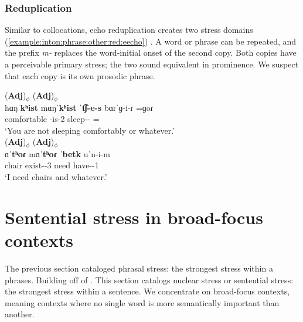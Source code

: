 \subsubsection{Reduplication}\label{section:intonation:phrase:other:redup}

Similar to collocations, echo reduplication creates two stress domains (\ref{example:inton:phrase:other:red:eecho})    \citep[14]{Margaryan-1997-ArmenianPhonology}. A word or phrase can be repeated, and the prefix  \textit{m-} replaces the word-initial onset of the second copy. Both copies have a perceivable primary stress; the two sound equivalent in prominence. We suspect that each copy is its own prosodic phrase. 

\begin{exe}
	\ex \label{example:inton:phrase:other:red:eecho}\begin{xlist}
		\ex \glll (\textbf{Adj})$_\phi$ (\textbf{Adj})$_\phi$ \\
		hɑŋˈ\textbf{kʰist} mɑŋˈ\textbf{kʰist}  ˈ\textbf{t͡ʃ-e-s}  bɑɾˈ{ɡ-i-ɾ} =ɡoɾ \\
		comfortable {\redgloss} {\neggloss}-is-2{\sg} sleep-{\thgloss}-{\cn} ={\prog}  \\
		\trans `You are not sleeping comfortably or whatever.' \\
		\ex \glll (\textbf{Adj})$_\phi$ (\textbf{Adj})$_\phi$ \\
		ɑˈ\textbf{tʰoɾ}  mɑˈ\textbf{tʰoɾ}  ˈ\textbf{betk} uˈn-i-m  \\
		chair {\redgloss} exist-{\thgloss}-3{\sg} need have-{\thgloss}-1{\sg} \\
		\trans `I need   chairs and whatever.'  \\
	\end{xlist}
\end{exe}


\section{Sentential stress in broad-focus contexts}\label{section:intonation:broadFocus}
The previous section cataloged phrasal stress:  the strongest stress   within a phrases. Building off of \citet{Dolatian-2022-InterfaceNuclearStressWesternArmenianTurkishPersian}. This section catalogs nuclear stress or sentential stress: the strongest stress within a sentence.  We concentrate on broad-focus contexts, meaning contexts where no single word is more semantically important than another. 

